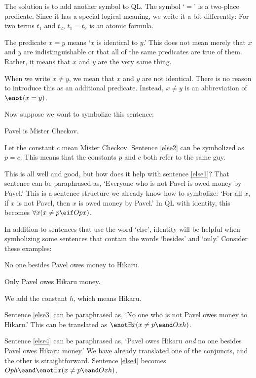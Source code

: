 The solution is to add another symbol to QL. The symbol `$=$' is a two-place predicate. Since it has a special logical meaning, we write it a bit differently: For two terms $t_1$ and $t_2$, $t_1=t_2$ is an atomic formula.

The predicate $x=y$ means `$x$ is identical to $y$.' This does not mean merely that $x$ and $y$ are indistinguishable or that all of the same predicates are true of them. Rather, it means that $x$ and $y$ are the very same thing.

When we write $x \neq y$, we mean that $x$ and $y$ are not identical. There is no reason to introduce this as an additional predicate. Instead, $x \neq y$ is an abbreviation of $\enot(x = y)$.

Now suppose we want to symbolize this sentence:
\begin{earg}
\item[\ex{else2}] Pavel is Mister Checkov.
\end{earg}
Let the constant $c$ mean Mister Checkov. Sentence \ref{else2} can be symbolized as $p=c$. This means that the constants $p$ and $c$ both refer to the same guy.

This is all well and good, but how does it help with sentence \ref{else1}? That sentence can be paraphrased as, `Everyone who is not Pavel is owed money by Pavel.' This is a sentence structure we already know how to symbolize: `For all $x$, if $x$ is not Pavel, then $x$ is owed money by Pavel.' In QL with identity, this becomes $\forall x (x\neq p \eif Opx)$.

In addition to sentences that use the word `else', identity will be helpful when symbolizing some sentences that contain the words `besides' and `only.' Consider these examples:

\begin{earg}
\item[\ex{else3}] No one besides Pavel owes money to Hikaru.
\item[\ex{else4}] Only Pavel owes Hikaru money.
\end{earg}

We add the constant $h$, which means Hikaru.

Sentence \ref{else3} can be paraphrased as, `No one who is not Pavel owes money to Hikaru.' This can be translated as $\enot\exists x(x\neq p \eand Oxh)$.

Sentence \ref{else4} can be paraphrased as, `Pavel owes Hikaru \emph{and} no one besides Pavel owes Hikaru money.' We have already translated one of the conjuncts, and the other is straightforward. Sentence \ref{else4} becomes $Oph \eand \enot\exists x(x\neq p \eand Oxh)$.


